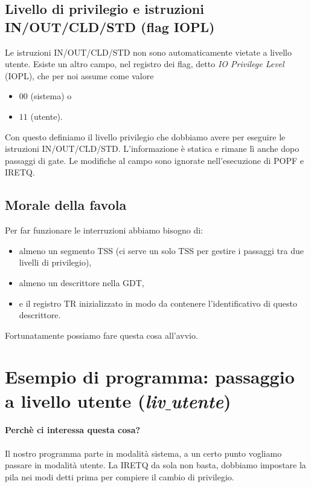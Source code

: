 \documentclass[11pt]{report}
\theoremstyle{definition}
\begin{document}
	
\subsection{Livello di privilegio e istruzioni IN/OUT/CLD/STD (flag IOPL)}
Le istruzioni IN/OUT/CLD/STD non sono automaticamente vietate a livello utente. Esiste un altro campo, nel registro dei flag, detto \emph{IO Privilege Level} (IOPL), che per noi assume come valore 
\begin{multicols}{2}
\begin{itemize}
	\item $00$ (sistema) o
	\item $11$ (utente).
\end{itemize} 
\end{multicols} \noindent Con questo definiamo il livello privilegio che dobbiamo avere per eseguire le istruzioni IN/OUT/CLD/STD. L'informazione è statica e rimane lì anche dopo passaggi di gate. Le modifiche al campo sono ignorate nell'esecuzione di POPF e IRETQ. 

\subsection{Morale della favola}
\begin{framed}
\noindent Per far funzionare le interruzioni abbiamo bisogno di:
	\begin{itemize}
		\item almeno un segmento TSS (ci serve un solo TSS per gestire i passaggi tra due livelli di privilegio),
		\item almeno un descrittore nella GDT,
		\item e il registro TR inizializzato in modo da contenere l'identificativo di questo descrittore. 
	\end{itemize}  Fortunatamente possiamo fare questa cosa all'avvio.
\end{framed}
\clearpage

\section{Esempio di programma: passaggio a livello utente (\emph{liv$\_$utente})}
\paragraph{Perchè ci interessa questa cosa?} Il nostro programma parte in modalità sistema, a un certo punto vogliamo passare in modalità utente. La IRETQ da sola non basta, dobbiamo impostare la pila nei modi detti prima per compiere il cambio di privilegio.
\end{document}

